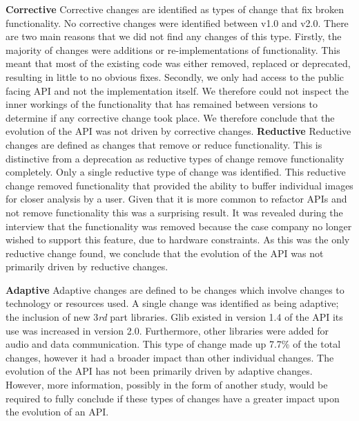 \documentclass{sig-alternate}
\begin{document}
\smallskip \noindent
\textbf{Corrective  }
Corrective changes are identified as types of change that fix broken functionality.
No corrective changes were identified between v1.0 and v2.0. There are two main reasons that we did not find any changes of this type. Firstly, the majority of changes were additions or re-implementations of functionality. This meant that most of the existing code was either removed, replaced or deprecated, resulting in little to no obvious fixes. Secondly, we only had access to the public facing API and not the implementation itself. We therefore could not inspect the inner workings of the functionality that has remained between versions to determine if any corrective change took place.
We therefore conclude that the evolution of the API was not driven by corrective changes.
\smallskip \noindent
\textbf{Reductive  }
Reductive changes are defined as changes that remove or reduce functionality. This is distinctive from a deprecation as reductive types of change remove functionality completely.
Only a single reductive type of change was identified. This reductive change removed functionality that provided the ability to buffer individual images for closer analysis by a user. Given that it is more common to refactor APIs and not remove functionality \cite{dig2005role, xing2006refactoring} this was a surprising result. 
It was revealed during the interview that the functionality was removed because the case company no longer wished to support this feature, due to hardware constraints. 
As this was the only reductive change found, we conclude that the evolution of the API was not primarily driven by reductive changes.

\smallskip \noindent
\textbf{Adaptive  }
Adaptive changes are defined to be changes which involve changes to technology or resources used. 
A single change was identified as being adaptive; the inclusion of new 3\textit{rd} part libraries. Glib existed in version 1.4 of the API its use was increased in version 2.0. Furthermore, other libraries were added for audio and data communication. This type of change made up 7.7\% of the total changes, however it had a broader impact than other individual changes.
The evolution of the API has not been primarily driven by adaptive changes. However, more information, possibly in the form of another study, would be required to fully conclude if these types of changes have a greater impact upon the evolution of an API.
\end{document}
